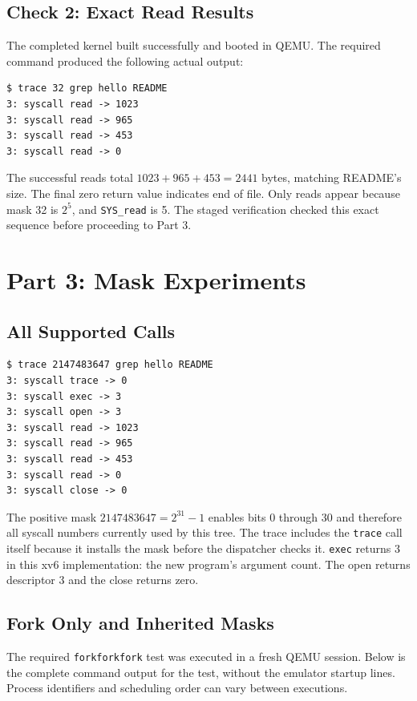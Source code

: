 \documentclass[12pt,a4paper]{article}
\begin{document}
\subsection{Check 2: Exact Read Results}
The completed kernel built successfully and booted in QEMU. The required command
produced the following actual output:

\begin{lstlisting}[caption={Check 2: read-only tracing with the completed kernel}]
$ trace 32 grep hello README
3: syscall read -> 1023
3: syscall read -> 965
3: syscall read -> 453
3: syscall read -> 0
\end{lstlisting}

The successful reads total \(1023+965+453=2441\) bytes, matching README's size.
The final zero return value indicates end of file. Only reads appear because mask
32 is \(2^5\), and \texttt{SYS\_read} is 5. The staged verification checked this
exact sequence before proceeding to Part 3.

\section{Part 3: Mask Experiments}
\subsection{All Supported Calls}

\begin{lstlisting}[caption={All supported mask bits enabled}]
$ trace 2147483647 grep hello README
3: syscall trace -> 0
3: syscall exec -> 3
3: syscall open -> 3
3: syscall read -> 1023
3: syscall read -> 965
3: syscall read -> 453
3: syscall read -> 0
3: syscall close -> 0
\end{lstlisting}

The positive mask \(2147483647=2^{31}-1\) enables bits 0 through 30 and therefore
all syscall numbers currently used by this tree. The trace includes the
\texttt{trace} call itself because it installs the mask before the dispatcher
checks it. \texttt{exec} returns 3 in this xv6 implementation: the new program's
argument count. The open returns descriptor 3 and the close returns zero.

\subsection{Fork Only and Inherited Masks}
The required \texttt{forkforkfork} test was executed in a fresh QEMU session.
Below is the complete command output for the test, without the emulator startup
lines. Process identifiers and scheduling order can vary between executions.
\end{document}

